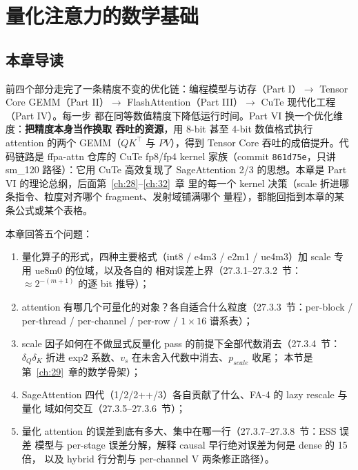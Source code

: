\chapter{量化注意力的数学基础}\label{ch:27}

\section{本章导读}

前四个部分走完了一条精度不变的优化链：编程模型与访存（Part I）$\to$ Tensor Core
GEMM（Part II）$\to$ FlashAttention（Part III）$\to$ CuTe 现代化工程（Part IV）。每一步
都在同等数值精度下降低运行时间。Part VI 换一个优化维度：\textbf{把精度本身当作换取
吞吐的资源}，用 8-bit 甚至 4-bit 数值格式执行 attention 的两个 GEMM（$QK^{\top}$ 与
$PV$），得到 Tensor Core 吞吐的成倍提升。代码链路是 ffpa-attn 仓库的 CuTe fp8/fp4 kernel
家族（commit \texttt{861d75e}，只讲 sm\_120 路径）：它用 CuTe 高效复现了 SageAttention
2/3 的思想。本章是 Part VI 的理论总纲，后面第~\ref{ch:28}--\ref{ch:32}~章
里的每一个 kernel 决策（scale 折进哪条指令、粒度对齐哪个 fragment、发射域铺满哪个
量程），都能回指到本章的某条公式或某个表格。

本章回答五个问题：
\begin{enumerate}[itemsep=0pt,topsep=2pt]
  \item 量化算子的形式，四种主要格式（int8 / e4m3 / e2m1 / ue4m3）加 scale
        专用 ue8m0 的位域，以及各自的
        相对误差上界（27.3.1--27.3.2~节：$\approx 2^{-(m+1)}$ 的逐 bit 推导）；
  \item attention 有哪几个可量化的对象？各自适合什么粒度（27.3.3~节：per-block /
        per-thread / per-channel / per-row / $1\times16$ 谱系表）；
  \item scale 因子如何在不做显式反量化 pass 的前提下全部代数消去（27.3.4~节：
        $\delta_Q\delta_K$ 折进 exp2 系数、$v_s$ 在未舍入代数中消去、$p_{scale}$ 收尾；
        本节是第~\ref{ch:29}~章的数学骨架）；
  \item SageAttention 四代（1/2/2++/3）各自贡献了什么、FA-4 的 lazy rescale 与量化
        域如何交互（27.3.5--27.3.6~节）；
  \item 量化 attention 的误差到底有多大、集中在哪一行（27.3.7--27.3.8~节：ESS 误差
        模型与 per-stage 误差分解，解释 causal 早行绝对误差为何是 dense 的 15 倍，
        以及 hybrid 行分割与 per-channel V 两条修正路径）。
\end{enumerate}

